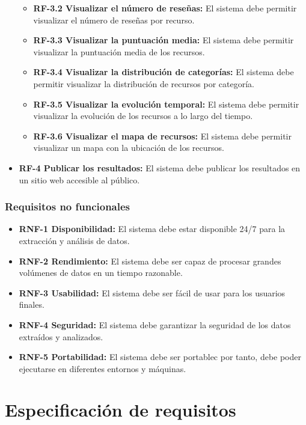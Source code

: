 \begin{itemize}
\begin{itemize}
			\item \textbf{RF-3.2 Visualizar el número de reseñas:} El sistema debe permitir visualizar el número de reseñas por recurso.
			\item \textbf{RF-3.3 Visualizar la puntuación media:} El sistema debe permitir visualizar la puntuación media de los recursos.
			\item \textbf{RF-3.4 Visualizar la distribución de categorías:} El sistema debe permitir visualizar la distribución de recursos por categoría.
			\item \textbf{RF-3.5 Visualizar la evolución temporal:} El sistema debe permitir visualizar la evolución de los recursos a lo largo del tiempo.
			\item \textbf{RF-3.6 Visualizar el mapa de recursos:} El sistema debe permitir visualizar un mapa con la ubicación de los recursos.
		\end{itemize}
	\item \textbf{RF-4 Publicar los resultados:} El sistema debe publicar los resultados en un sitio web accesible al público.
\end{itemize}

\subsubsection{Requisitos no funcionales}

\begin{itemize}
	\item \textbf{RNF-1 Disponibilidad:} El sistema debe estar disponible 24/7 para la extracción y análisis de datos.
	\item \textbf{RNF-2 Rendimiento:} El sistema debe ser capaz de procesar grandes volúmenes de datos en un tiempo razonable.
	\item \textbf{RNF-3 Usabilidad:} El sistema debe ser fácil de usar para los usuarios finales.
	\item \textbf{RNF-4 Seguridad:} El sistema debe garantizar la seguridad de los datos extraídos y analizados.
	\item \textbf{RNF-5 Portabilidad:} El sistema debe ser portablec por tanto, debe poder ejecutarse en diferentes entornos y máquinas.
\end{itemize}

\section{Especificación de requisitos}

